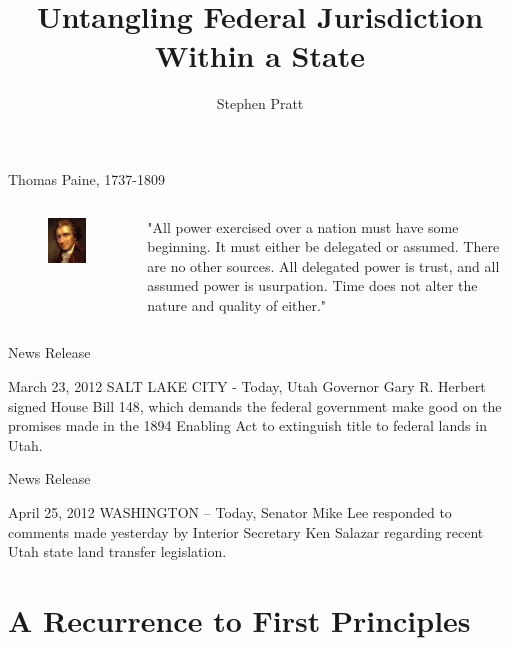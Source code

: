 \documentclass{beamer}
\begin{document}
\title[Untangling Federal Jurisdiction]{Untangling Federal Jurisdiction Within a State}
\author{Stephen Pratt}

\frame{\titlepage}

\begin{frame}{Thomas Paine, 1737-1809}
    \begin{columns}[c]
        \column{2in}
            \begin{figure}[h]
                \includegraphics{img/thomas-paine.png}
            \end{figure}
        \column{1.5in}
            "All power exercised over a nation must have some beginning.  It must either be delegated or assumed.  There are no other sources.  All delegated power is trust, and all assumed power is usurpation.  Time does not alter the nature and quality of either."
    \end{columns}
\end{frame}

\begin{frame}{News Release}
    \begin{block}{March 23, 2012}
    SALT LAKE CITY - Today, Utah Governor Gary R. Herbert signed House Bill 148, which demands the federal government make good on the promises made in the 1894 Enabling Act to extinguish title to federal lands in Utah. 
    \end{block}
\end{frame}

\begin{frame}{News Release}
    \begin{block}{April 25, 2012}
    WASHINGTON – Today, Senator Mike Lee responded to comments made yesterday by Interior Secretary Ken Salazar regarding recent Utah state land transfer legislation.
    \end{block}
\end{frame}

\section{A Recurrence to First Principles}
\end{document}
